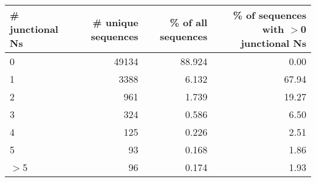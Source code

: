 \begin{tabular}{lrrr}
  \toprule \# junctional Ns & \# unique sequences & \% of all sequences & \% of sequences with $>$0 junctional Ns \\ 
  \midrule 0 & 49134 & 88.924 & 0.00 \\ 
  1 & 3388 & 6.132 & 67.94 \\ 
  2 & 961 & 1.739 & 19.27 \\ 
  3 & 324 & 0.586 & 6.50 \\ 
  4 & 125 & 0.226 & 2.51 \\ 
  5 & 93 & 0.168 & 1.86 \\ 
  $>$5 & 96 & 0.174 & 1.93 \\ 
   \bottomrule \end{tabular}

